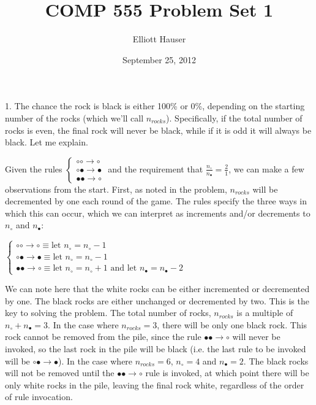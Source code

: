 \documentclass[12pt]{amsart}
\title{COMP 555 Problem Set 1}
\author{Elliott Hauser}
\date{September 25, 2012}
\begin{document}
\maketitle

1. The chance the rock is black is either 100\% or 0\%, depending on the starting number of the rocks (which we'll call $n_{rocks}$).  Specifically, if the total number of rocks is even, the final rock will never be black, while if it is odd it will always be black.  Let me explain.

Given the rules $\begin{cases} \circ \circ \rightarrow  \circ 
 \\
 \circ \bullet \rightarrow \bullet 
 \\
 \bullet \bullet \rightarrow \circ 
\end{cases} $ and the requirement that $\frac{n_\circ} {n_\bullet} = \frac{2}{1}$, we can make a few observations from the start.  First, as noted in the problem, $n_{rocks}$ will be decremented by one each round of the game.  The rules specify the three ways in which this can occur, which we can interpret as increments and/or decrements to $n_\circ$ and $n_\bullet$:
\begin{center}
$\begin{cases} \circ \circ \rightarrow  \circ \equiv \text{let $n_\circ = n_\circ-1$}
 \\
 \circ \bullet \rightarrow \bullet \equiv \text{let $n_\circ = n_\circ-1$}
 \\
 \bullet \bullet \rightarrow \circ \equiv \text{let $n_\circ = n_\circ+1$ and let $n_\bullet = n_\bullet -2$}
\end{cases}$ 
\end{center}

We can note here that the white rocks can be either incremented or decremented by one.  The black rocks are either unchanged or decremented by two.  This is the key to solving the problem.  The total number of rocks, $n_{rocks}$ is a multiple of $n_\circ +n_\bullet =  3$.  In the case where $n_{rocks} =3$,  there will be only one black rock.  This rock cannot be removed from the pile, since the rule $ \bullet \bullet \rightarrow \circ $ will never be invoked, so the last rock in the pile will be black (i.e. the last rule to be invoked will be $ \circ \bullet \rightarrow \bullet $).  In the case where $n_{rocks} = 6$, $n_\circ = 4$ and $n_\bullet = 2$.  The black rocks will not be removed until the $ \bullet \bullet \rightarrow \circ $ rule is invoked, at which point there will be only white rocks in the pile, leaving the final rock white, regardless of the order of rule invocation.  
\end{document}
